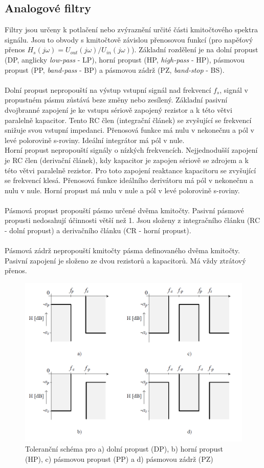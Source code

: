\subsection{Analogové filtry}
Filtry jsou určeny k potlačení nebo zvýraznění určité části kmitočtového spektra signálu. Jsou to obvody s kmitočtově závislou přenosovou funkcí (pro napěťový přenos $H_s(j \omega) = U_{out}(j \omega)/U_{in}(j \omega)$). Základní rozdělení je na dolní propust (DP, anglicky \textit{low-pass} - LP), horní propust (HP, \textit{high-pass} - HP), pásmovou propust (PP, \textit{band-pass} - BP) a pásmovou zádrž (PZ, \textit{band-stop} - BS). \\
\\
Dolní propust nepropouští na výstup vstupní signál nad frekvencí $f_s$, signál v propustném pásmu zůstává beze změny nebo zesílený. Základní pasivní dvojbranné zapojení je ke vstupu sériově zapojený rezistor a k této větvi paralelně kapacitor. Tento RC člen (integrační článek) se zvyšující se frekvencí snižuje svou vstupní impedanci. Přenosová funkce má nulu v nekonečnu a pól v levé polorovině s-roviny. Ideální integrátor má pól v nule. \\
Horní propust nepropouští signály o nízkých frekvencích. Nejjednodušší zapojení je RC člen (derivační článek), kdy kapacitor je zapojen sériově se zdrojem a k této větvi paralelně rezistor. Pro toto zapojení reaktance kapacitoru se zvyšující se frekvencí klesá. Přenosová funkce ideálního derivátoru má pól v nekonečnu a nulu v nule. Horní propust má nulu v nule a pól v levé polorovině s-roviny.\\
\\
Pásmová propust propouští pásmo určené dvěma kmitočty. Pasivní pásmové propusti nedosahují účinnosti větší než 1. Jsou složeny z integračního článku (RC - dolní propust) a derivačního článku (CR - horní propust).\\
\\
Pásmová zádrž nepropouští kmitočty pásma definovaného dvěma kmitočty. Pasivní zapojení je složeno ze dvou rezistorů a kapacitorů. Má vždy ztrátový přenos.
\begin{figure}[h]
\centering
\includegraphics[scale=0.55]{tolerancnischemata.png}
\caption[Toleranční schéma]{Toleranční schéma pro a) dolní propust (DP), b) horní propust (HP), c) pásmovou propust (PP) a d) pásmovou zádrž (PZ)\cite{1}}
\end{figure}
